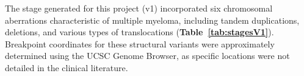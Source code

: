 The stage generated for this project (v1) incorporated six chromosomal 
aberrations characteristic of multiple myeloma, including tandem duplications, 
deletions, and various types of translocations (\textbf{Table~\ref{tab:stagesV1}}). 
Breakpoint coordinates for these structural variants were approximately 
determined using the UCSC Genome Browser, as specific locations were not 
detailed in the clinical literature.





\begingroup
\vspace{0.35cm}

\footnotesize

